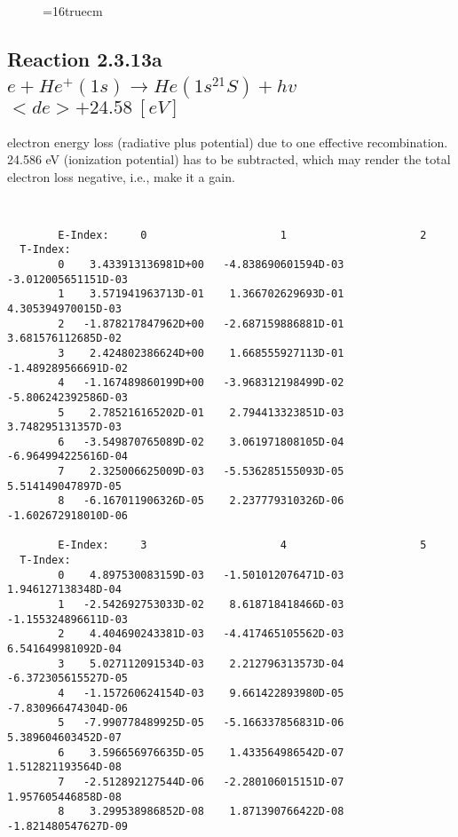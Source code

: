 \documentclass[12pt,dvipdfmx]{article}
\begin{document}
\begin{figure} \label{2.3.9aec}
\epsfxsize=16truecm
\end{figure}
\newpage



\subsection{
Reaction 2.3.13a $e + He^+(1s) \rightarrow   He(1s^21S)+ hv $ \ $<de>+24.58 \ [eV]$ }


  electron energy loss (radiative plus potential) due to one effective
  recombination. 24.586 eV (ionization potential) has to be
  subtracted, which may render the total electron loss negative, i.e., make it a gain.

\begin{small}\begin{verbatim}


        E-Index:     0                     1                     2
  T-Index:
        0    3.433913136981D+00   -4.838690601594D-03   -3.012005651151D-03
        1    3.571941963713D-01    1.366702629693D-01    4.305394970015D-03
        2   -1.878217847962D+00   -2.687159886881D-01    3.681576112685D-02
        3    2.424802386624D+00    1.668555927113D-01   -1.489289566691D-02
        4   -1.167489860199D+00   -3.968312198499D-02   -5.806242392586D-03
        5    2.785216165202D-01    2.794413323851D-03    3.748295131357D-03
        6   -3.549870765089D-02    3.061971808105D-04   -6.964994225616D-04
        7    2.325006625009D-03   -5.536285155093D-05    5.514149047897D-05
        8   -6.167011906326D-05    2.237779310326D-06   -1.602672918010D-06

        E-Index:     3                     4                     5
  T-Index:
        0    4.897530083159D-03   -1.501012076471D-03    1.946127138348D-04
        1   -2.542692753033D-02    8.618718418466D-03   -1.155324896611D-03
        2    4.404690243381D-03   -4.417465105562D-03    6.541649981092D-04
        3    5.027112091534D-03    2.212796313573D-04   -6.372305615527D-05
        4   -1.157260624154D-03    9.661422893980D-05   -7.830966474304D-06
        5   -7.990778489925D-05   -5.166337856831D-06    5.389604603452D-07
        6    3.596656976635D-05    1.433564986542D-07    1.512821193564D-08
        7   -2.512892127544D-06   -2.280106015151D-07    1.957605446858D-08
        8    3.299538986852D-08    1.871390766422D-08   -1.821480547627D-09


\end{verbatim}
\end{small}
\end{document}
